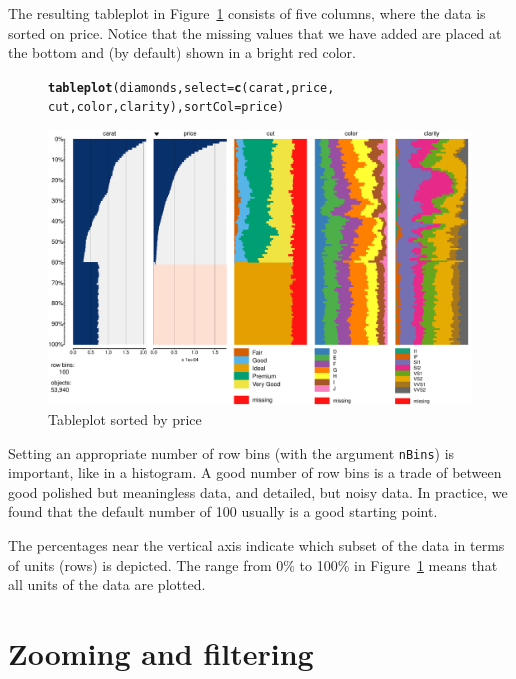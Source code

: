 \documentclass[11pt, fleqn, a4paper]{article}\usepackage[]{graphicx}\usepackage[]{color}
\makeatletter
\def\maxwidth{ %
  \ifdim\Gin@nat@width>\linewidth
    \linewidth
  \else
    \Gin@nat@width
  \fi
}
\newcommand{\hlstd}[1]{\textcolor[rgb]{0.345,0.345,0.345}{#1}}%
\newcommand{\hlkwc}[1]{\textcolor[rgb]{0.333,0.667,0.333}{#1}}%
\newcommand{\hlkwd}[1]{\textcolor[rgb]{0.737,0.353,0.396}{\textbf{#1}}}%
\newenvironment{kframe}{%
 \def\at@end@of@kframe{}%
 \ifinner\ifhmode%
  \def\at@end@of@kframe{\end{minipage}}%
  \begin{minipage}{\columnwidth}%
 \fi\fi%
 \def\FrameCommand##1{\hskip\@totalleftmargin \hskip-\fboxsep
 \colorbox{shadecolor}{##1}\hskip-\fboxsep
     \hskip-\linewidth \hskip-\@totalleftmargin \hskip\columnwidth}%
 \MakeFramed {\advance\hsize-\width
   \@totalleftmargin\z@ \linewidth\hsize
   \@setminipage}}%
 {\par\unskip\endMakeFramed%
 \at@end@of@kframe}
\newenvironment{knitrout}{}{} %
\makeatother
\begin{document}
The resulting tableplot in Figure~\ref{fig:tp2} consists of five columns, where the data is sorted on price. Notice that the missing values that we have added are placed at the bottom and (by default) shown in a bright red color.

\begin{figure}[!htp]
\begin{knitrout}
\color{fgcolor}\begin{kframe}
\begin{alltt}
\hlkwd{tableplot}\hlstd{(diamonds,} \hlkwc{select} \hlstd{=} \hlkwd{c}\hlstd{(carat, price,}
    \hlstd{cut, color, clarity),} \hlkwc{sortCol} \hlstd{= price)}
\end{alltt}
\end{kframe}
\includegraphics[width=\maxwidth]{figure/chunk3} 

\end{knitrout}

\caption{Tableplot sorted by price}
\label{fig:tp2}
\end{figure}

Setting an appropriate number of row bins (with the argument {\tt nBins}) is important, like in a histogram. A good number of row bins is a trade of between good polished but meaningless data, and detailed, but noisy data. In practice, we found that the default number of 100 usually is a good starting point.

The percentages near the vertical axis indicate which subset of the data in terms of units (rows) is depicted. The range from 0\% to 100\% in Figure~\ref{fig:tp2} means that all units of the data are plotted.

\section{Zooming and filtering}
\end{document}
